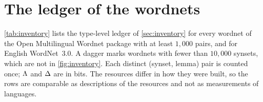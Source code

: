 \section{The ledger of the wordnets}\label{app:inventory}
\cref{tab:inventory} lists the type-level ledger of \cref{sec:inventory} for every wordnet of the Open Multilingual Wordnet package with at least $1{,}000$ pairs, and for English WordNet~3.0. A dagger marks wordnets with fewer than $10{,}000$ synsets, which are not in \cref{fig:inventory}. Each distinct (synset, lemma) pair is counted once; $\Lambda$ and $\Delta$ are in bits. The resources differ in how they were built, so the rows are comparable as descriptions of the resources and not as measurements of languages.
\begin{table}[tbp]
\caption{The type-level ledger of 32 wordnets.}\label{tab:inventory}
\centering\small\renewcommand{\arraystretch}{1.05}

\end{table}
